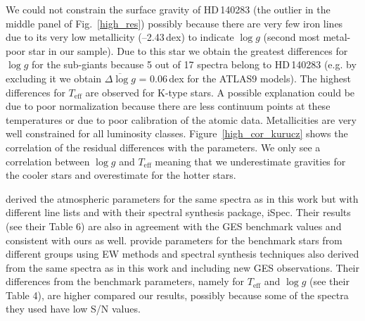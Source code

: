 \documentclass[fleqn,usenatbib]{mnras}
\begin{document}
We could not constrain the surface gravity of HD\,140283 (the outlier in the middle panel of Fig.~\ref{high_res}) possibly because there are very few iron lines due to its very low metallicity 
(--2.43\,dex) to indicate $\log g$ (second most metal-poor star in our sample). Due to this star we obtain the greatest differences for $\log g$ for the sub-giants 
because 5 out of 17 spectra belong to HD\,140283 (e.g. by excluding it we obtain $\overline{\Delta \log g}$ = 0.06\,dex for the ATLAS9 models). 
The highest differences for $T_{\mathrm{eff}}$ are observed for K-type stars. A possible explanation could be due to poor normalization because there are less continuum 
points at these temperatures or due to poor calibration of the atomic data. Metallicities are very well constrained for all luminosity classes.
Figure~\ref{high_cor_kurucz} shows the correlation of the residual differences with the parameters. We only see a correlation between $\log g$ and $T_{\mathrm{eff}}$ meaning 
that we underestimate gravities for the cooler stars and overestimate for the hotter stars.

\citet{blanco2014a} derived the atmospheric parameters for the same spectra as in this work but with different line lists and with their spectral synthesis package, iSpec. 
Their results (see their Table 6) are also in agreement with the GES benchmark values and consistent with ours as well. \citet{Smiljanic2014} provide parameters for the benchmark stars 
from different groups using EW methods and spectral synthesis techniques also derived from the same spectra as in this work and including new GES observations. 
Their differences from the benchmark parameters, namely for $T_{\mathrm{eff}}$ and $\log g$ (see their Table 4), are higher compared our results, possibly because some of the spectra they used 
have low S/N values. 
\end{document}
